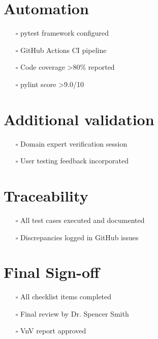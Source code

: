 \documentclass{article}
\begin{document}
\section*{Automation}
\begin{itemize}[leftmargin=*]
    \item[$\square$] pytest framework configured
    \item[$\square$] GitHub Actions CI pipeline
    \item[$\square$] Code coverage >80\% reported
    \item[$\square$] pylint score >9.0/10
\end{itemize}

\section*{Additional validation}  
\begin{itemize}[leftmargin=*]
    \item[$\square$] Domain expert verification session
    \item[$\square$] User testing feedback incorporated
\end{itemize}

\section*{Traceability}
\begin{itemize}[leftmargin=*]
    \item[$\square$] All test cases executed and documented
    \item[$\square$] Discrepancies logged in GitHub issues
\end{itemize}

\section*{Final Sign-off}
\begin{itemize}[leftmargin=*]
    \item[$\square$] All checklist items completed
    \item[$\square$] Final review by Dr. Spencer Smith
    \item[$\square$] VnV report approved
\end{itemize}
\end{document}
